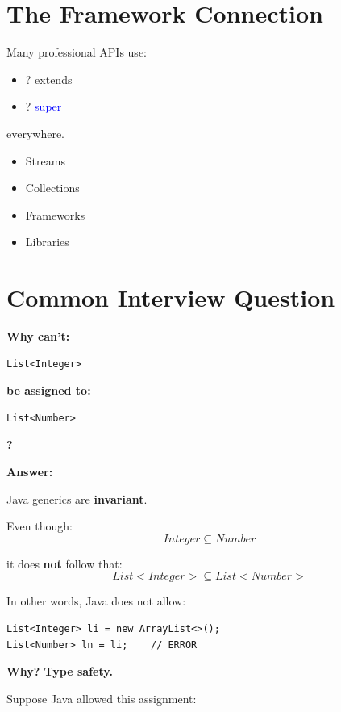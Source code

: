 \documentclass[11pt,a4paper]{book}
\begin{document}
\section{The Framework Connection}

Many professional APIs use:
\begin{itemize}
\item [ ] \textcolor{RosettaRed}{?} \textcolor{RosettaDeepGreen}{extends}
\item [ ] \textcolor{RosettaRed}{?} \textcolor{blue}{super}
\end{itemize}
everywhere.

\begin{itemize}
\item [-]Streams
\item [-]Collections
\item [-]Frameworks
\item [-]Libraries
\end{itemize}

\section{Common Interview Question}

\textbf{Why can't:}

\begin{verbatim}
List<Integer>
\end{verbatim}

\textbf{be assigned to:}

\begin{verbatim}
List<Number>
\end{verbatim}

\textbf{?}

\textbf{Answer:}

Java generics are \textbf{invariant}.

Even though:
\[
Integer \subseteq Number
\]

it does \textbf{not} follow that:
\[
List<Integer> \subseteq List<Number>
\]

In other words, Java does not allow:
\begin{verbatim}
List<Integer> li = new ArrayList<>();
List<Number> ln = li;    // ERROR
\end{verbatim}

\textbf{Why? Type safety.}

Suppose Java allowed this assignment:
\end{document}
